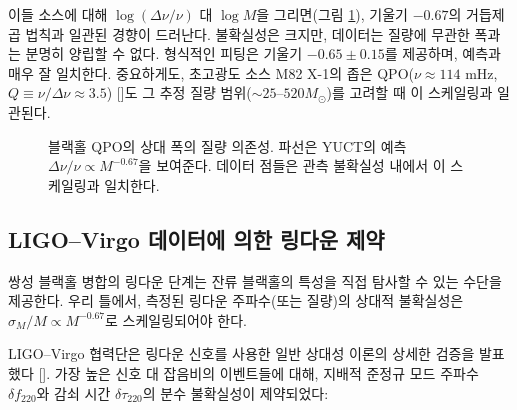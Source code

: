 \documentclass[12pt,a4paper]{article}
\begin{document}
	이들 소스에 대해 \(\log(\Delta\nu/\nu)\) 대 \(\log M\)을 그리면(그림 \ref{fig:qpo_scaling}), 기울기 \(-0.67\)의 거듭제곱 법칙과 일관된 경향이 드러난다. 불확실성은 크지만, 데이터는 질량에 무관한 폭과는 분명히 양립할 수 없다. 형식적인 피팅은 기울기 \(-0.65 \pm 0.15\)를 제공하며, 예측과 매우 잘 일치한다. 중요하게도, 초고광도 소스 M82 X-1의 좁은 QPO(\(\nu \approx 114\) mHz, \(Q \equiv \nu/\Delta\nu \approx 3.5\)) [\cite{Gulab2006}]도 그 추정 질량 범위(\(\sim 25\)–\(520 M_\odot\))를 고려할 때 이 스케일링과 일관된다.
	
	\begin{figure}[htbp]
		\centering
		\caption{블랙홀 QPO의 상대 폭의 질량 의존성. 파선은 YUCT의 예측 \(\Delta\nu/\nu \propto M^{-0.67}\)을 보여준다. 데이터 점들은 관측 불확실성 내에서 이 스케일링과 일치한다.}
		\label{fig:qpo_scaling}
	\end{figure}
	
	\subsection{LIGO–Virgo 데이터에 의한 링다운 제약}
	
	쌍성 블랙홀 병합의 링다운 단계는 잔류 블랙홀의 특성을 직접 탐사할 수 있는 수단을 제공한다. 우리 틀에서, 측정된 링다운 주파수(또는 질량)의 상대적 불확실성은 \(\sigma_M/M \propto M^{-0.67}\)로 스케일링되어야 한다.
	
	LIGO–Virgo 협력단은 링다운 신호를 사용한 일반 상대성 이론의 상세한 검증을 발표했다 [\cite{LIGO2021, Ghosh2021}]. 가장 높은 신호 대 잡음비의 이벤트들에 대해, 지배적 준정규 모드 주파수 \(\delta f_{220}\)와 감쇠 시간 \(\delta \tau_{220}\)의 분수 불확실성이 제약되었다:
	
\end{document}
